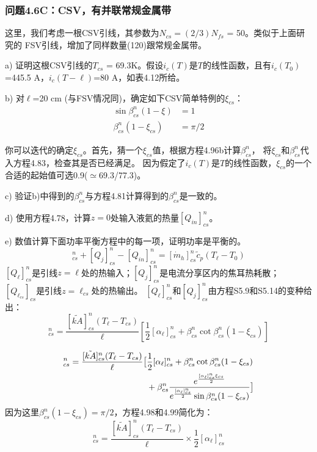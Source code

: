 \subsubsection{问题4.6C：CSV，有并联常规金属带}
这里，我们考虑一根CSV引线，其参数为$N_{cs} = (2/3)N_{fs}$ = 50。类似于上面研究的
FSV引线，增加了同样数量(120)跟常规金属带。

a) 证明这根CSV引线的$T_{cs}$ = 69.3K。假设$i_c(T)$是$T$的线性函数，且有$i_c(T_0)$=445.5 A，$i_c(T-\ell)$=80 A，如表4.12所给。

b) 对$\ell$=20 cm (与FSV情况同)，确定如下CSV简单特例的$\xi_{cs}$：
\begin{subequations}%
	\begin{align*}
\sin\beta_{cs}^{n}(1-\xi)&=1\\
\beta_{cs}^{n}(1-\xi_{cs})&=\pi/2
	\end{align*}
\end{subequations}

你可以迭代的确定$\xi_{cs}$。首先，猜一个$\xi_{cs}$值，根据方程4.96b计算$\beta_{cs}^n$，
将$\xi_{cs}$和$\beta_{cs}^n$代入方程4.83，检查其是否已经满足。
因为假定了$i_c(T)$是$T$的线性函数，$\xi_{cs}$的一个合适的起始值可选0.9($\simeq $69.3/77.3)。

c) 验证b)中得到的$\beta_{cs}^n$与方程4.81计算得到的$\beta_{cs}^n$是一致的。 

d) 使用方程4.78，计算$z=0$处输入液氦的热量$[Q_{in}]^n_{cs}$。

e) 数值计算下面功率平衡方程中的每一项，证明功率是平衡的。
\begin{equation}%
[Q_\ell]_{cs}^{n}+[Q_j]_{cs}^{n}-[Q_{in}]_{cs}^{n}=[\dot{m}_h]_{cs}^{n}\tilde{c}_p(T_\ell-T_0)
\end{equation}
$[Q_\ell]_{cs}^{n}$是引线$z=\ell$处的热输入；$[Q_j]_{cs}^{n}$是电流分享区内的焦耳热耗散；
$[Q_{\ell_{cs}}]_{cs}$是引线$z=\ell_{cs}$处的热输出。
$[Q_\ell]_{cs}^{n}$和$[Q_j]_{cs}^{n}$由方程S5.9和S5.14的变种给出：
\begin{equation}%
[Q_\ell]_{cs}^{n}=\frac{[\tilde{kA}]_{cs}^{n}(T_\ell-T_{cs})}{\ell}[\frac{1}{2}[\alpha_\ell]_{cs}^{n}+\beta_{cs}^{n}\cot\beta_{cs}^{n}(1-\xi_{cs})]
\end{equation}

\begin{align*}%
[Q_j]_{cs}^{n}=\frac{[\tilde{kA}]_{cs}^{n}(T_\ell-T_{cs})}{\ell}\big[&\frac{1}{2}[\alpha_\ell]_{cs}^{n}+\beta_{cs}^{n}\cot\beta_{cs}^{n}(1-\xi_{cs}) \\\notag
&+\beta_{cs}^{n}\frac{e^{\frac{[\alpha_\ell]_{cs}^{n}\xi_{cs}}{2}}}{e^{\frac{[\alpha_\ell]_{cs}^{n}}{2}}\sin\beta_{cs}^{n}(1-\xi_{cs})}\big]
\end{align*}
因为这里$\beta_{cs}^n (1-\xi_{cs})=\pi/2$，方程4.98和4.99简化为：
\begin{equation}%
[Q_\ell]_{cs}^{n}=\frac{[\tilde{kA}]_{cs}^{n}(T_\ell-T_{cs})}{\ell}\times\frac{1}{2}[\alpha_\ell]_{cs}^{n}
\end{equation}


